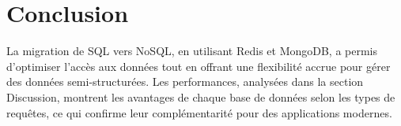 \chapter{Conclusion}
La migration de SQL vers NoSQL, en utilisant Redis et MongoDB, a permis d’optimiser l’accès aux données tout en offrant une flexibilité accrue pour gérer des données semi-structurées. Les performances, analysées dans la section Discussion, montrent les avantages de chaque base de données selon les types de requêtes, ce qui confirme leur complémentarité pour des applications modernes.